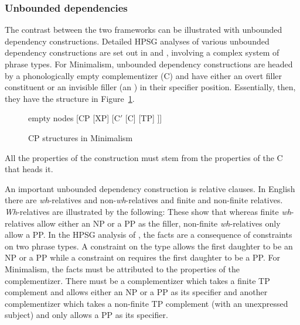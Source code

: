 \documentclass[output=paper]{langsci/langscibook}
\begin{document}
\subsubsection{Unbounded dependencies}

The contrast between the two frameworks can be illustrated with unbounded dependency
constructions. Detailed HPSG analyses of various unbounded dependency constructions are set out in
\citet{Sag97a,Sag2010b} and \citet{GSag2000a-u}, involving a complex system of phrase types. For
Minimalism, unbounded dependency constructions are headed by a phonologically empty complementizer
(C) and have either an overt filler constituent or an invisible filler (an ) in their
specifier position. Essentially, then, they have the structure in Figure~\ref{fig:min-CP}.
\begin{figure}
	\centering
	\begin{forest} %
		empty nodes
		[CP
		[XP]
		[C$'$ [C] [TP]
		]]
	\end{forest}
	\caption{\label{fig:min-CP}CP structures in Minimalism}
\end{figure}
All the properties of the construction must stem from the properties of the C that heads it. 

An important unbounded dependency construction is relative clauses. In English there are \emph{wh}-relatives and non-\emph{wh}-relatives and finite and non-finite relatives. \emph{Wh}-relatives are illustrated by the following:
\eal
{}\label{ex:min-someone-who-can}
\label{ex:min-someone-on-whom-can}
\zl 
\eal
{}\label{ex:min-someone-who-to}
\label{ex:min-someone-whom-to}
\zl 
These show that whereas finite \emph{wh}-relatives allow either an NP or a PP as the filler,
non-finite \emph{wh}-relatives only allow a PP. In the HPSG analysis of \citet{Sag97a}, the facts
are a consequence of constraints on two phrase types. A constraint on the type
 allows the first daughter to be an
NP or a PP while a constraint on 
requires the first daughter to be a PP. For Minimalism, the facts must be attributed to the
properties of the complementizer. There must be a complementizer which takes a finite TP complement
and allows either an NP or a PP as its specifier and another complementizer which takes a non-finite
TP complement (with an unexpressed subject) and only allows a PP as its specifier. 
\end{document}
